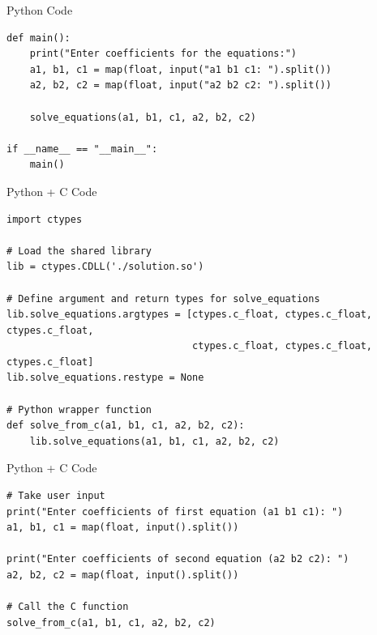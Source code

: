 \documentclass{beamer}
\begin{document}
\begin{frame}[fragile]{Python Code}
    \begin{verbatim}
def main():
    print("Enter coefficients for the equations:")
    a1, b1, c1 = map(float, input("a1 b1 c1: ").split())
    a2, b2, c2 = map(float, input("a2 b2 c2: ").split())

    solve_equations(a1, b1, c1, a2, b2, c2)

if __name__ == "__main__":
    main()
    \end{verbatim}
\end{frame}

\begin{frame}[fragile]{Python + C Code}
    \begin{verbatim}
import ctypes

# Load the shared library
lib = ctypes.CDLL('./solution.so')

# Define argument and return types for solve_equations
lib.solve_equations.argtypes = [ctypes.c_float, ctypes.c_float, ctypes.c_float,
                                ctypes.c_float, ctypes.c_float, ctypes.c_float]
lib.solve_equations.restype = None

# Python wrapper function
def solve_from_c(a1, b1, c1, a2, b2, c2):
    lib.solve_equations(a1, b1, c1, a2, b2, c2)
    \end{verbatim}
\end{frame}

\begin{frame}[fragile]{Python + C Code}
    \begin{verbatim}
# Take user input
print("Enter coefficients of first equation (a1 b1 c1): ")
a1, b1, c1 = map(float, input().split())

print("Enter coefficients of second equation (a2 b2 c2): ")
a2, b2, c2 = map(float, input().split())

# Call the C function
solve_from_c(a1, b1, c1, a2, b2, c2)
    \end{verbatim}
\end{frame}
\end{document}
